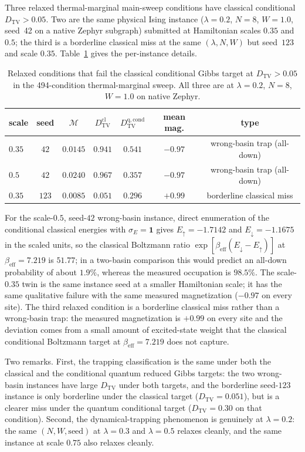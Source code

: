 \documentclass[aps,prapplied,reprint,superscriptaddress,floatfix,nofootinbib]{revtex4-2}
\begin{document}
Three relaxed thermal-marginal main-sweep conditions have classical conditional
$D_\mathrm{TV}>0.05$.  Two are the same physical Ising instance
($\lambda=0.2$, $N=8$, $W=1.0$, seed~42 on a native Zephyr subgraph)
submitted at Hamiltonian scales $0.35$ and $0.5$; the third is a
borderline classical miss at the same $(\lambda,N,W)$ but seed~$123$ and
scale $0.35$.  Table~\ref{tab:phase6_trapping} gives the per-instance
details.

\begin{table}[!htbp]
\centering
\caption{Relaxed conditions that fail the classical conditional Gibbs
target at $D_\mathrm{TV}>0.05$ in the 494-condition thermal-marginal
sweep.  All three are at $\lambda=0.2$, $N=8$, $W=1.0$ on native
Zephyr.}
\label{tab:phase6_trapping}
\begin{tabular}{lcccccc}
\toprule
scale & seed & $\mathcal{M}$ & $D_\mathrm{TV}^{\mathrm{cl}}$ & $D_\mathrm{TV}^{\mathrm{q,cond}}$ & mean mag. & type \\
\midrule
$0.35$ & $42$  & $0.0145$ & $0.941$  & $0.541$ & $-0.97$ & wrong-basin trap (all-down) \\
$0.5$  & $42$  & $0.0240$ & $0.967$  & $0.357$ & $-0.97$ & wrong-basin trap (all-down) \\
$0.35$ & $123$ & $0.0085$ & $0.051$  & $0.296$ & $+0.99$ & borderline classical miss \\
\bottomrule
\end{tabular}
\end{table}

For the scale-$0.5$, seed-$42$ wrong-basin instance, direct enumeration
of the conditional classical energies with $\sigma_E=\mathbf{1}$ gives
$E_\uparrow=-1.7142$ and $E_\downarrow=-1.1675$ in the scaled units, so
the classical Boltzmann ratio
$\exp[\beta_\mathrm{eff}(E_\downarrow-E_\uparrow)]$ at
$\beta_\mathrm{eff}=7.219$ is $51.77$; in a two-basin comparison this
would predict an all-down probability of about $1.9\%$, whereas the
measured occupation is $98.5\%$.  The scale-$0.35$ twin is
the same instance seed at a smaller Hamiltonian scale; it has the same
qualitative failure with the same measured magnetization
($-0.97$ on every site).  The third relaxed condition is a borderline
classical miss rather than a wrong-basin trap: the measured
magnetization is $+0.99$ on every site and the deviation comes from a
small amount of excited-state weight that the classical conditional
Boltzmann target at $\beta_\mathrm{eff}=7.219$ does not capture.

Two remarks.  First, the trapping classification is the same under
both the classical and the conditional quantum reduced Gibbs targets:
the two wrong-basin instances have large $D_\mathrm{TV}$ under both
targets, and the borderline seed-$123$ instance is only borderline
under the classical target ($D_\mathrm{TV}=0.051$), but is a clearer
miss under the quantum conditional target
($D_\mathrm{TV}=0.30$ on that condition).  Second, the
dynamical-trapping phenomenon is genuinely at $\lambda=0.2$: the same
$(N,W,\mathrm{seed})$ at $\lambda=0.3$ and $\lambda=0.5$ relaxes
cleanly, and the same instance at scale $0.75$ also relaxes cleanly.
\end{document}
